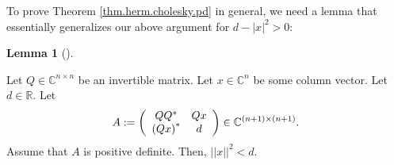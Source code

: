 \documentclass[numbers=enddot,12pt,final,onecolumn,notitlepage]{scrartcl}%
\numberwithin{exer}{subsection}
\theoremstyle{definition}
\newtheorem{lem}[theo]{Lemma}
\newenvironment{lemma}[1][]
{\begin{lem}[#1]\begin{leftbar}}
{\end{leftbar}\end{lem}}
\begin{document}
To prove Theorem \ref{thm.herm.cholesky.pd} in general, we need a lemma that
essentially generalizes our above argument for $d-\left\vert x\right\vert
^{2}>0$:

\begin{lemma}
\label{lem.herm.cholesky.x2d}Let $Q\in\mathbb{C}^{n\times n}$ be an invertible
matrix. Let $x\in\mathbb{C}^{n}$ be some column vector. Let $d\in\mathbb{R}$.
Let%
\[
A:=\left(
\begin{array}
[c]{cc}%
QQ^{\ast} & Qx\\
\left(  Qx\right)  ^{\ast} & d
\end{array}
\right)  \in\mathbb{C}^{\left(  n+1\right)  \times\left(  n+1\right)  }.
\]
Assume that $A$ is positive definite. Then, $\left\vert \left\vert
x\right\vert \right\vert ^{2}<d$.
\end{lemma}
\end{document}
